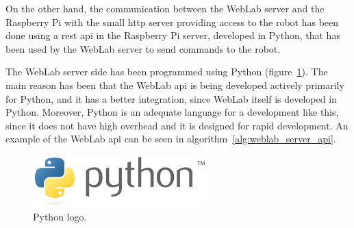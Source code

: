 On the other hand, the communication between the WebLab server and the Raspberry Pi with the small
\acrshort{http} server providing access to the robot has been done using a \acrshort{rest}
\acrshort{api} in the Raspberry Pi server, developed in Python, that has been used by the WebLab
server to send commands to the robot.

The WebLab server side has been programmed using Python (figure~\ref{fig:python}). The main reason
has been that the WebLab \acrshort{api} is being developed actively primarily for Python, and it has
a better integration, since WebLab itself is developed in Python. Moreover, Python is an adequate
language for a development like this, since it does not have high overhead and it is designed for
rapid development. An example of the WebLab \acrshort{api} can be seen in
algorithm~\ref{alg:weblab_server_api}.

\begin{figure}[!htbp]
	\centering
	\includegraphics[width=0.6\textwidth]{fig/python}
	\caption{Python logo.}
	\label{fig:python}
\end{figure}

